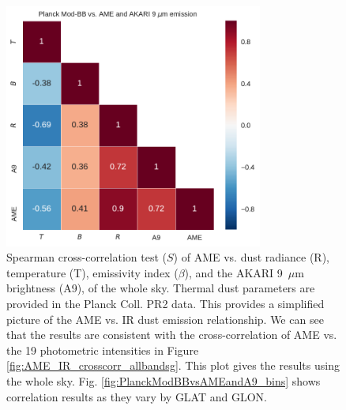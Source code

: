 \documentclass[preprint2,longabstract]{aastex}
\begin{document}
      \begin{figure}
        \label{fig:PlanckModBBvsAMEandA9}
        \includegraphics[width=85mm]{../Plots/PlanckModBBvsAMEandA9.pdf}
        \centering
        \caption{Spearman cross-correlation test ($S$) of AME vs. dust radiance (R), temperature (T),  emissivity index ($\beta$), and the AKARI 9~$\mu$m brightness (A9), of the whole sky. Thermal dust parameters are provided in the Planck Coll. PR2 data. This provides a simplified picture of the AME vs. IR dust emission relationship. We can see that the results are consistent with the cross-correlation of AME vs. the 19 photometric intensities in Figure \ref{fig:AME_IR_crosscorr_allbandsg}. This plot gives the results using the whole sky. Fig. \ref{fig:PlanckModBBvsAMEandA9_bins} shows correlation results as they vary by GLAT and GLON. }
      \end{figure}



\end{document}
